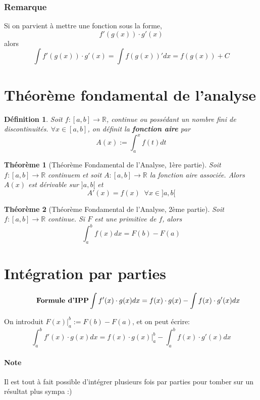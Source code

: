 \documentclass[10pt,a4paper]{book}
\newcommand{\R}{\mathbb{R}}
\newtheorem{theorem}{Théorème}[section]
\newtheorem{definition}{Définition}[section]
\begin{document}
\subsubsection{Remarque}

Si on parvient à mettre une fonction sous la forme,
\[f'(g(x))\cdot g'(x)\]
alors
\[\int f'(g(x))\cdot g'(x) = \int f(g(x))'dx = f(g(x)) + C\]

\section{Théorème fondamental de l'analyse}

\begin{definition}
Soit $f:[a,b]\rightarrow \R$, continue ou possédant un nombre fini de discontinuités. $\forall x \in [a,b]$, on définit la \textbf{fonction aire} par
\[A(x):= \int_a^x f(t)dt\]
\end{definition}

\begin{theorem}[Théorème Fondamental de l'Analyse, 1ère partie]
Soit $f:[a,b]\rightarrow \R$ continuem et soit $A:[a,b]\rightarrow \R$ la fonction aire associée. Alors $A(x)$ est dérivable sur $]a,b[$ et
\[A'(x) = f(x) \; \; \forall x \in ]a,b[\]
\end{theorem}

\begin{theorem}[Théorème Fondamental de l'Analyse, 2ème partie]
Soit $f:[a,b]\rightarrow \R$ continue. Si $F$ est une primitive de $f$, alors
\[\int_a^b f(x)dx = F(b) - F(a)\]
\end{theorem}

\section{Intégration par parties}

\begin{equation*} \tag*{\textbf{Formule d'IPP}}
\int f'(x)\cdot g(x)dx = f(x)\cdot g(x) - \int f(x) \cdot g'(x)dx
\end{equation*}

On introduit $F(x)\vert_a^b := F(b) - F(a)$, et on peut écrire:
\[\int_a^b f'(x)\cdot g(x)dx = f(x)\cdot g(x)\vert_a^b - \int_a^b f(x) \cdot g'(x)dx\]

\paragraph{Note} Il est tout à fait possible d'intégrer plusieurs fois par parties pour tomber sur un résultat plus sympa :)
\end{document}
